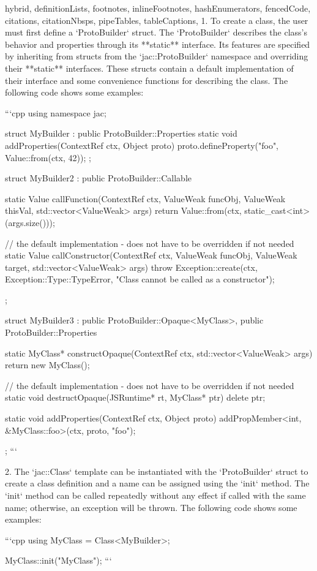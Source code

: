 \begin{markdown*}{%
  hybrid,
  definitionLists,
  footnotes,
  inlineFootnotes,
  hashEnumerators,
  fencedCode,
  citations,
  citationNbsps,
  pipeTables,
  tableCaptions,
}
  1. To create a class, the user must first define a `ProtoBuilder` struct. The `ProtoBuilder` describes the class's behavior and properties through its **static** interface. Its features are specified by inheriting from structs from the `jac::ProtoBuilder` namespace and overriding their **static** interfaces. These structs contain a default implementation of their interface and some convenience functions for describing the class. The following code shows some examples:

```cpp
using namespace jac;

struct MyBuilder : public ProtoBuilder::Properties {
    static void addProperties(ContextRef ctx, Object proto) {
        proto.defineProperty("foo", Value::from(ctx, 42));
    }
};

struct MyBuilder2 : public ProtoBuilder::Callable {
    static Value callFunction(ContextRef ctx, ValueWeak funcObj, ValueWeak thisVal, std::vector<ValueWeak> args) {
        return Value::from(ctx, static_cast<int>(args.size()));
    }

    // the default implementation - does not have to be overridden if not needed
    static Value callConstructor(ContextRef ctx, ValueWeak funcObj, ValueWeak target, std::vector<ValueWeak> args) {
        throw Exception::create(ctx, Exception::Type::TypeError, "Class cannot be called as a constructor");
    }
};

struct MyBuilder3 : public ProtoBuilder::Opaque<MyClass>, public ProtoBuilder::Properties {
    static MyClass* constructOpaque(ContextRef ctx, std::vector<ValueWeak> args) {
        return new MyClass();
    }

    // the default implementation - does not have to be overridden if not needed
    static void destructOpaque(JSRuntime* rt, MyClass* ptr) {
        delete ptr;
    }

    static void addProperties(ContextRef ctx, Object proto) {
        addPropMember<int, &MyClass::foo>(ctx, proto, "foo");
    }
};
```

  2. The `jac::Class` template can be instantiated with the `ProtoBuilder` struct to create a class definition and a name can be assigned using the `init` method. The `init` method can be called repeatedly without any effect if called with the same name; otherwise, an exception will be thrown. The following code shows some examples:

```cpp
using MyClass = Class<MyBuilder>;

MyClass::init("MyClass");
```


\end{markdown*}
